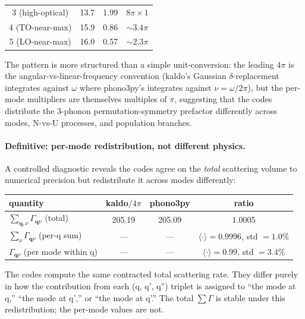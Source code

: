 \documentclass[11pt,a4paper]{article}
\begin{document}
\begin{itemize}[leftmargin=2em, itemsep=2pt]
\begin{center}
\begin{tabular}{c|c|c|c}
        3 (high-optical)   & 13.7 & 1.99 & $8\pi \times 1$  \\
        4 (TO-near-max)    & 15.9 & 0.86 & $\sim 3.4\pi$    \\
        5 (LO-near-max)    & 16.0 & 0.57 & $\sim 2.3\pi$    \\
        \bottomrule
        \end{tabular}
        \end{center}
        The pattern is more structured than a simple unit-conversion: the leading $4\pi$ is the
        angular-vs-linear-frequency convention (kaldo's Gaussian $\delta$-replacement integrates
        against $\omega$ where phono3py's integrates against $\nu = \omega/2\pi$), but the
        per-mode multipliers are themselves multiples of $\pi$, suggesting that the codes
        distribute the 3-phonon permutation-symmetry prefactor differently across modes,
        N-vs-U processes, and population branches.
\end{itemize}

\paragraph{Definitive: per-mode redistribution, not different physics.} A controlled diagnostic
reveals the codes agree on the \emph{total} scattering volume to numerical precision but
redistribute it across modes differently:
\begin{center}
\renewcommand{\arraystretch}{1.15}
\begin{tabular}{l c c c}
\toprule
quantity & kaldo$/4\pi$ & phono3py & ratio \\
\midrule
$\sum_{\mathbf{q},\nu}\Gamma_{\mathbf{q}\nu}$ (total) & 205.19 & 205.09 & 1.0005 \\
$\sum_{\nu}\Gamma_{\mathbf{q}\nu}$ (per-q sum) & --- & --- & $\langle\cdot\rangle = 0.9996$, std $= 1.0\%$ \\
$\Gamma_{\mathbf{q}\nu}$ (per mode within q) & --- & --- & $\langle\cdot\rangle = 0.99$, std $= 3.4\%$ \\
\bottomrule
\end{tabular}
\end{center}

\noindent The codes compute the same contracted total scattering rate. They differ purely
in how the contribution from each (q, q', q'') triplet is assigned to ``the mode at q,'' ``the
mode at q','' or ``the mode at q'.'' The total $\sum \Gamma$ is stable under this
redistribution; the per-mode values are not.
\end{document}
